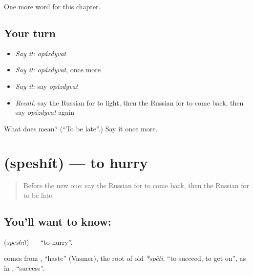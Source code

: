 \begin{grammarlens}[title={What you've built}]
One more word for this chapter.
\end{grammarlens}

\subsection*{Your turn}
\begin{itemize}
\raggedright
  \item \emph{Say it:} \emph{opázdyvat}
  \item \emph{Say it:} \emph{opázdyvat}, once more
  \item \emph{Say it:} say \emph{opázdyvat}
  \item \emph{Recall:} say the Russian for to light, then the Russian for to come back, then say \emph{opázdyvat} again
\end{itemize}

\begin{tcolorbox}[breakable,colback=teal!4,colframe=teal!35!black,title={Before you move on}]
What does  mean? (\textquotedblleft{}To be late\textquotedblright{}.) Say it once more.
\end{tcolorbox}
\section[\texorpdfstring{\ru{спешить} (speshít)}{спешить (speshít)}]{ (speshít) — to hurry}

\label{lesson:RU-C176-speshit}



\begin{quote}
Before the new one: say the Russian for to come back, then the Russian for to be late.
\end{quote}

\subsection*{You'll want to know: }
\textbf{} (\emph{speshít}) — \textquotedblleft{}to hurry\textquotedblright{}.

\begin{cousinweb}
\textbf{} comes from \emph{}, \textquotedblleft{}haste\textquotedblright{} (Vasmer), the root of old \emph{*spěti}, \textquotedblleft{}to succeed, to get on\textquotedblright{}, as in \emph{}, \textquotedblleft{}success\textquotedblright{}.
\end{cousinweb}

